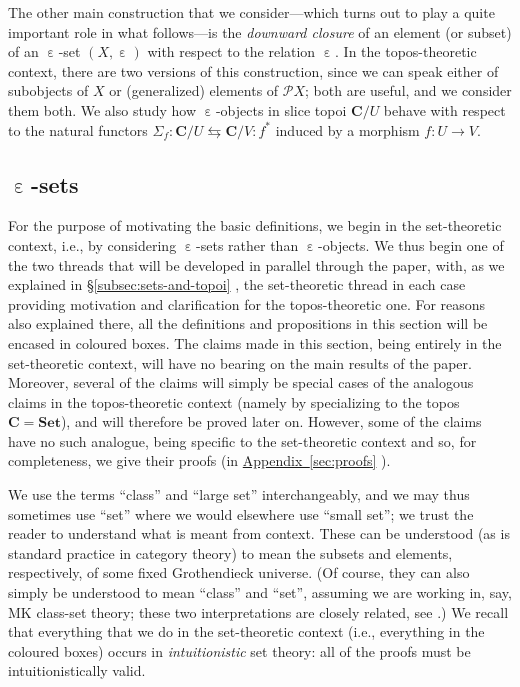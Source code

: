 \documentclass{amsart}
\newcommand\alttext{\texorpdfstring}
\newcommand\bC{\mathbf{C}}
\newcommand\ein{\mathrel{\varepsilon}}
\newcommand\pow{\mathcal{P}}
\newcommand\Set{\mathbf{Set}}
\newcommand\toot{\leftrightarrows}
\newcommand\unein{{\ein}}
\newcommand\prerefpost[3]{%
  \texorpdfstring%
    {\hyperref[#2]{#1\ref*{#2}#3}}%
    {#1\ref*{#2}#3}%
}
\newcommand\sref[1]{\prerefpost{\S}{#1}{}}
\newcommand\aref[1]{\prerefpost{Appendix~}{#1}{}}
\theoremstyle{definition}
\theoremstyle{remark}
\theoremstyle{plainwithref}
\begin{document}
The other main construction that we consider---which turns out to play a quite important role in what follows---is the \emph{downward closure} of an element (or subset) of an \( \unein \)-set \( (X, \unein) \) with respect to the relation \( \unein \).
In the topos-theoretic context, there are two versions of this construction, since we can speak either of subobjects of \( X \) or (generalized) elements of \( \pow X \); both are useful, and we consider them both.
We also study how \( \unein \)-objects in slice topoi \( \bC / U \) behave with respect to the natural functors \( \Sigma_f \colon \bC / U \toot \bC / V \colon f^* \) induced by a morphism \( f \colon U \to V \).

\subsection{\alttext{\( \unein \)}{ε}-sets} \label{subsec:ein-sets}
For the purpose of motivating the basic definitions, we begin in the set-theoretic context, i.e., by considering \( \unein \)-sets rather than \( \unein \)-objects.
We thus begin one of the two threads that will be developed in parallel through the paper, with, as we explained in \sref{subsec:sets-and-topoi}, the set-theoretic thread in each case providing motivation and clarification for the topos-theoretic one.
For reasons also explained there, all the definitions and propositions in this section will be encased in coloured boxes.
The claims made in this section, being entirely in the set-theoretic context, will have no bearing on the main results of the paper.
Moreover, several of the claims will simply be special cases of the analogous claims in the topos-theoretic context (namely by specializing to the topos \( \bC = \Set \)), and will therefore be proved later on.
However, some of the claims have no such analogue, being specific to the set-theoretic context and so, for completeness, we give their proofs (in \aref{sec:proofs}).

We use the terms ``class'' and ``large set'' interchangeably, and we may thus sometimes use ``set'' where we would elsewhere use ``small set''; we trust the reader to understand what is meant from context.
These can be understood (as is standard practice in category theory) to mean the subsets and elements, respectively, of some fixed Grothendieck universe.
(Of course, they can also simply be understood to mean ``class'' and ``set'', assuming we are working in, say, MK class-set theory; these two interpretations are closely related, see \cite[Theorem~13.1]{makkai-set-theory}.)
We recall that everything that we do in the set-theoretic context (i.e., everything in the coloured boxes) occurs in \emph{intuitionistic} set theory: all of the proofs must be intuitionistically valid.
\end{document}
